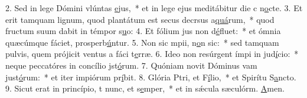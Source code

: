 2. Sed in lege Dómini vlúntas \uline{e}jus,~* et in lege ejus meditábitur die c n\uline{o}cte.
3. Et erit tamquam lignum, quod plantátum est secus decrsus a\uline{quá}rum,~* quod fructum suum dabit in témpor s\uline{u}o:
4. Et fólium jus non d\uline{é}fluet:~* et ómnia quæcúmque fáciet, prosperb\uline{ú}ntur.
5. Non sic mpii, n\uline{o}n sic:~* sed tamquam pulvis, quem prójicit ventus a fáci t\uline{e}rræ.
6. Ideo non resúrgent ímpi in jud\uline{í}cio:~* neque peccatóres in concílio jst\uline{ó}rum.
7. Quóniam novit Dóminus vam just\uline{ó}rum:~* et iter impiórum pr\uline{í}bit.
8. Glória Ptri, et F\uline{í}lio,~* et Spirítu S\uline{a}ncto.
9. Sicut erat in princípio, t nunc, et s\uline{e}mper,~* et in sǽcula sæculórm. \uline{A}men.
